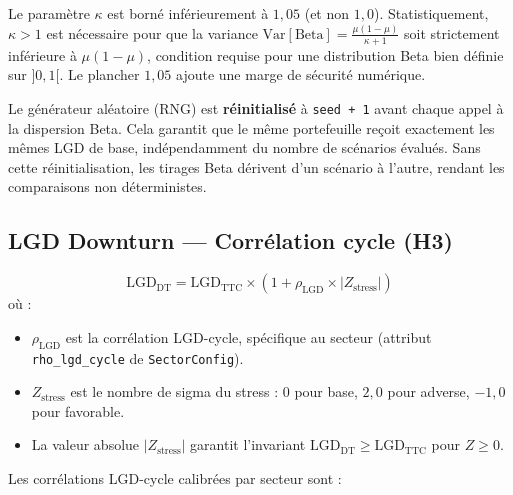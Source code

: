 \documentclass[12pt,a4paper]{article}
\begin{document}
\begin{warningbox}
Le param\`etre $\kappa$ est born\'e inf\'erieurement \`a $1{,}05$ (et non $1{,}0$). Statistiquement, $\kappa > 1$ est n\'ecessaire pour que la variance $\text{Var}[\text{Beta}] = \frac{\mu(1-\mu)}{\kappa+1}$ soit strictement inf\'erieure \`a $\mu(1-\mu)$, condition requise pour une distribution Beta bien d\'efinie sur $]0, 1[$. Le plancher $1{,}05$ ajoute une marge de s\'ecurit\'e num\'erique.
\end{warningbox}

\begin{interpretbox}
Le g\'en\'erateur al\'eatoire (RNG) est \textbf{r\'einitialis\'e} \`a \texttt{seed + 1} avant chaque appel \`a la dispersion Beta. Cela garantit que le m\^eme portefeuille re\c{c}oit exactement les m\^emes LGD de base, ind\'ependamment du nombre de sc\'enarios \'evalu\'es. Sans cette r\'einitialisation, les tirages Beta d\'erivent d'un sc\'enario \`a l'autre, rendant les comparaisons non d\'eterministes.
\end{interpretbox}

\subsection{LGD Downturn --- Corr\'elation cycle (H3)}

\begin{formulebox}
\begin{equation}
\label{eq:lgd_dt}
\text{LGD}_{\text{DT}} = \text{LGD}_{\text{TTC}} \times \left(1 + \rho_{\text{LGD}} \times |Z_{\text{stress}}|\right)
\end{equation}
o\`u :
\begin{itemize}
    \item $\rho_{\text{LGD}}$ est la corr\'elation LGD-cycle, sp\'ecifique au secteur (attribut \texttt{rho\_lgd\_cycle} de \texttt{SectorConfig}).
    \item $Z_{\text{stress}}$ est le nombre de sigma du stress : $0$ pour base, $2{,}0$ pour adverse, $-1{,}0$ pour favorable.
    \item La valeur absolue $|Z_{\text{stress}}|$ garantit l'invariant $\text{LGD}_{\text{DT}} \geq \text{LGD}_{\text{TTC}}$ pour $Z \geq 0$.
\end{itemize}
\end{formulebox}

Les corr\'elations LGD-cycle calibr\'ees par secteur sont :
\end{document}
